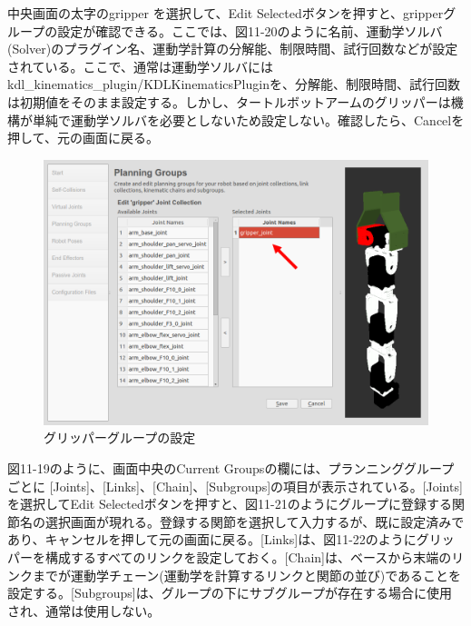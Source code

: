 中央画面の太字のgripper を選択して、Edit Selectedボタンを押すと、gripperグループの設定が確認できる。ここでは、図11-20のように名前、運動学ソルバ(Solver)のプラグイン名、運動学計算の分解能、制限時間、試行回数などが設定されている。ここで、通常は運動学ソルバにはkdl\_kinematics\_plugin/KDLKinematicsPluginを、分解能、制限時間、試行回数は初期値をそのまま設定する。しかし、タートルボットアームのグリッパーは機構が単純で運動学ソルバを必要としないため設定しない。確認したら、Cancelを押して、元の画面に戻る。

\begin{figure}[ht]
  \centering
  \includegraphics[width=\columnwidth]{pictures/chapter11/pic_11_20.png}
  \caption{グリッパーグループの設定}
\end{figure}

図11-19のように、画面中央のCurrent Groupsの欄には、プランニンググループごとに [Joints]、[Links]、[Chain]、[Subgroups]の項目が表示されている。[Joints]を選択してEdit Selectedボタンを押すと、図11-21のようにグループに登録する関節名の選択画面が現れる。登録する関節を選択して入力するが、既に設定済みであり、キャンセルを押して元の画面に戻る。[Links]は、図11-22のようにグリッパーを構成するすべてのリンクを設定しておく。[Chain]は、ベースから末端のリンクまでが運動学チェーン(運動学を計算するリンクと関節の並び)であることを設定する。[Subgroups]は、グループの下にサブグループが存在する場合に使用され、通常は使用しない。

